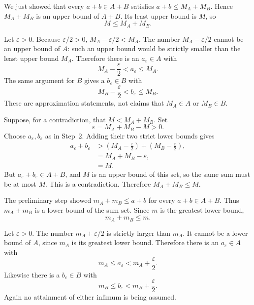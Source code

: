 We just showed that every $a+b\in A+B$ satisfies
$a+b\le M_A+M_B$. Hence $M_A+M_B$ is an upper bound of $A+B$.
Its least upper bound is $M$, so
\[
 M\le M_A+M_B.
\]

Let $\varepsilon>0$. Because $\varepsilon/2>0$,
$M_A-\varepsilon/2<M_A$. The number $M_A-\varepsilon/2$ cannot be
an upper bound of $A$: such an upper bound would be strictly smaller
than the least upper bound $M_A$. Therefore there is an
$a_\varepsilon\in A$ with
\[
 M_A-\frac\varepsilon2<a_\varepsilon\le M_A.
\]
The same argument for $B$ gives a $b_\varepsilon\in B$ with
\[
 M_B-\frac\varepsilon2<b_\varepsilon\le M_B.
\]
These are approximation statements, not claims that $M_A\in A$ or
$M_B\in B$.

Suppose, for a contradiction, that $M<M_A+M_B$. Set
\[
 \varepsilon=M_A+M_B-M>0.
\]
Choose $a_\varepsilon,b_\varepsilon$ as in Step~2. Adding their two
strict lower bounds gives
\begin{align*}
 a_\varepsilon+b_\varepsilon
   &>\left(M_A-\frac\varepsilon2\right)
       +\left(M_B-\frac\varepsilon2\right),\\
   &=M_A+M_B-\varepsilon,\\
   &=M.
\end{align*}
But $a_\varepsilon+b_\varepsilon\in A+B$, and $M$ is an upper bound
of this set, so the same sum must be at most $M$. This is a
contradiction. Therefore $M_A+M_B\le M$.


The preliminary step showed $m_A+m_B\le a+b$ for every $a+b\in A+B$.
Thus $m_A+m_B$ is a lower bound of the sum set. Since $m$ is the
greatest lower bound,
\[
 m_A+m_B\le m.
\]

Let $\varepsilon>0$. The number $m_A+\varepsilon/2$ is strictly larger
than $m_A$. It cannot be a lower bound of $A$, since $m_A$ is its
greatest lower bound. Therefore there is an $a_\varepsilon\in A$ with
\[
 m_A\le a_\varepsilon<m_A+\frac\varepsilon2.
\]
Likewise there is a $b_\varepsilon\in B$ with
\[
 m_B\le b_\varepsilon<m_B+\frac\varepsilon2.
\]
Again no attainment of either infimum is being assumed.

